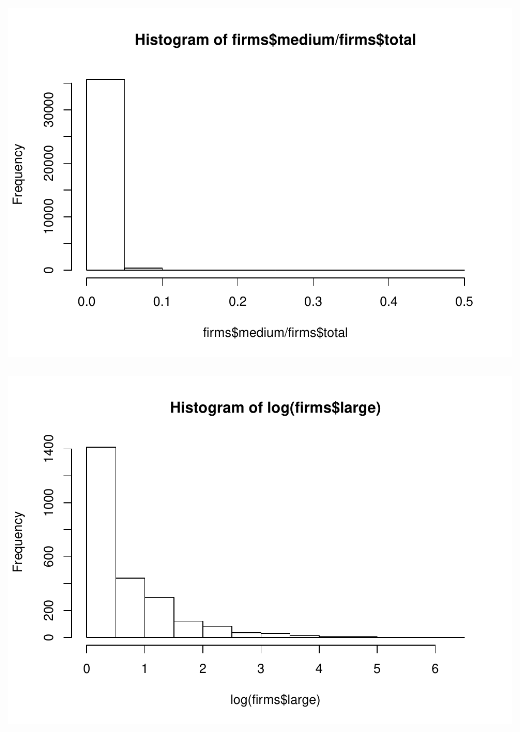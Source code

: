 \documentclass[]{article}
\newenvironment{Shaded}{\begin{snugshade}}{\end{snugshade}}
\newcommand{\KeywordTok}[1]{\textcolor[rgb]{0.13,0.29,0.53}{\textbf{#1}}}
\newcommand{\OperatorTok}[1]{\textcolor[rgb]{0.81,0.36,0.00}{\textbf{#1}}}
\newcommand{\NormalTok}[1]{#1}
\begin{document}
\begin{Shaded}
\end{Shaded}

\includegraphics{TSLproject_files/figure-latex/unnamed-chunk-7-9.pdf}

\begin{Shaded}
\end{Shaded}

\includegraphics{TSLproject_files/figure-latex/unnamed-chunk-7-10.pdf}
\end{document}
